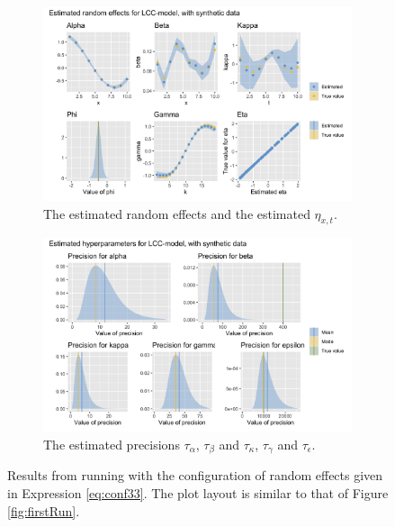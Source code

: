 \begin{figure}[h!]
    \centering
    \begin{subfigure}[b]{0.85\textwidth}
        \centering
        \includegraphics[width=\textwidth]{synthetic-data/Figures/effects-LCC-synthetic-3-3.png}
        \caption{The estimated random effects and the estimated $\eta_{x,t}$.}
        \label{fig:conf33-top}
    \end{subfigure}
    
    \begin{subfigure}[b]{0.6\textwidth}
        \centering
        \includegraphics[width=\textwidth]{synthetic-data/Figures/hyperparameters-LCC-synthetic-3-3.png}
        \caption{The estimated precisions $\tau_\alpha$, $\tau_\beta$ and $\tau_\kappa$, $\tau_\gamma$ and $\tau_\epsilon$.}
        \label{fig:conf33-bottom}
    \end{subfigure}
    \caption{Results from running \inlabru with the configuration of random effects given in Expression \ref{eq:conf33}. The plot layout is similar to that of Figure \ref{fig:firstRun}.}
    \label{fig:conf33}
\end{figure}
